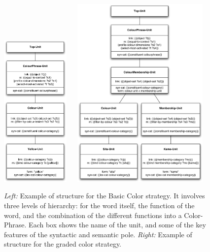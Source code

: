 \begin{figure}[htbp]
  \centerline{\includegraphics[width=0.3\textwidth]{chap11/figs/syntactic-basic} $~~~~$ 
\includegraphics[width=0.6\textwidth]{chap11/figs/syntactic-graded}}
\caption{\footnotesize\label{fig:syntactic-graded} 
{\it Left:} Example of structure for the Basic Color strategy. It involves three levels of hierarchy: for the word 
itself, the function of the word, and the combination of the different functions into a Color-Phrase. Each box 
shows the name of the unit, and some of the key features of the syntactic and semantic pole.
{\it Right:} Example of structure for the graded color strategy.}
\end{figure}

